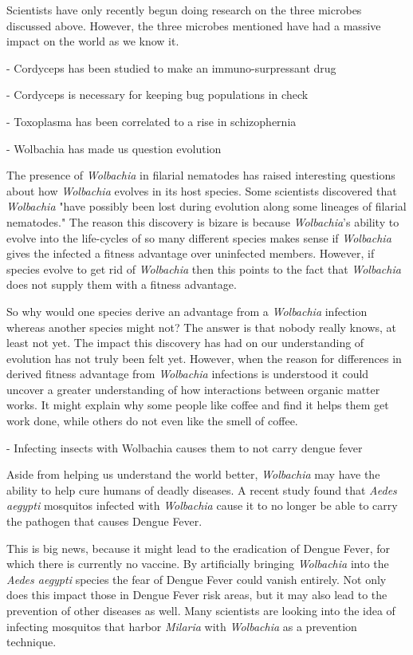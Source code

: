 \documentclass[twocolumn]{article}
\begin{document}
Scientists have only recently begun doing research on the three microbes discussed above. However, the three microbes mentioned have had a massive impact on the world as we know it. 

- Cordyceps has been studied to make an immuno-surpressant drug

- Cordyceps is necessary for keeping bug populations in check

- Toxoplasma has been correlated to a rise in schizophernia

- Wolbachia has made us question evolution

The presence of \textit{Wolbachia} in filarial nematodes has raised interesting questions about how \textit{Wolbachia} evolves in its host species. Some scientists discovered that \textit{Wolbachia} "have possibly been lost during evolution along some lineages of filarial nematodes."\cite{Wevolution_loss} The reason this discovery is bizare is because \textit{Wolbachia}'s ability to evolve into the life-cycles of so many different species makes sense if \textit{Wolbachia} gives the infected a fitness advantage over uninfected members. However, if species evolve to get rid of \textit{Wolbachia} then this points to the fact that \textit{Wolbachia} does not supply them with a fitness advantage.

So why would one species derive an advantage from a \textit{Wolbachia} infection whereas another species might not? The answer is that nobody really knows, at least not yet. The impact this discovery has had on our understanding of evolution has not truly been felt yet. However, when the reason for differences in derived fitness advantage from \textit{Wolbachia} infections is understood it could uncover a greater understanding of how interactions between organic matter works. It might explain why some people like coffee and find it helps them get work done, while others do not even like the smell of coffee.

- Infecting insects with Wolbachia causes them to not carry dengue fever

Aside from helping us understand the world better, \textit{Wolbachia} may have the ability to help cure humans of deadly diseases. A recent study found that \textit{Aedes aegypti} mosquitos infected with \textit{Wolbachia} cause it to no longer be able to carry the pathogen that causes Dengue Fever.\cite{Wdengue_fever}

This is big news, because it might lead to the eradication of Dengue Fever, for which there is currently no vaccine. By artificially bringing \textit{Wolbachia} into the \textit{Aedes aegypti} species the fear of Dengue Fever could vanish entirely. Not only does this impact those in Dengue Fever risk areas, but it may also lead to the prevention of other diseases as well. Many scientists are looking into the idea of infecting mosquitos that harbor \textit{Milaria} with \textit{Wolbachia} as a prevention technique.\cite{Wmilaria}
\end{document}
